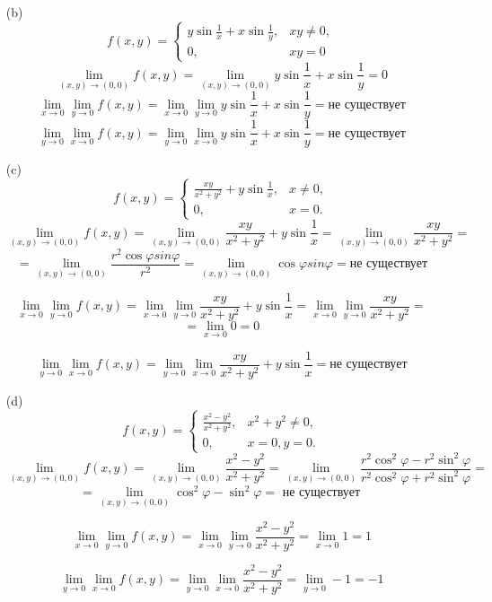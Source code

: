 \documentclass[a4paper]{article}
\begin{document}
\begin{enumerate}
\begin{enumerate}
        \item[(b)]$$ f(x, y) = \begin{cases} y \sin \frac{1}{x} + x \sin \frac{1}{y}, & xy \neq 0, \\ 0, & xy = 0 \end{cases} $$
        $$\lim_{(x, y) \to (0, 0)} f(x, y) = \lim_{(x, y) \to (0, 0)} y \sin \frac{1}{x} + x \sin \frac{1}{y} = 0$$
        $$\lim _{x \rightarrow 0} \lim _{y \rightarrow 0} f(x, y) = \lim _{x \rightarrow 0} \lim _{y \rightarrow 0} y \sin \frac{1}{x} + x \sin \frac{1}{y} = \text{не существует}$$
        $$\lim _{y \rightarrow 0} \lim _{x \rightarrow 0} f(x, y) = \lim _{y \rightarrow 0} \lim _{x \rightarrow 0} y \sin \frac{1}{x} + x \sin \frac{1}{y} = \text{не существует}$$
    
        \item[(c)]$$
        f(x, y) = \begin{cases}
        \frac{xy}{x^2 + y^2} + y \sin \frac{1}{x}, & x \neq 0, \\
        0, & x = 0.
        \end{cases}
        $$
        $$\lim_{(x, y) \to (0, 0)} f(x, y) = \lim_{(x, y) \to (0, 0)}\frac{xy}{x^2 + y^2} + y \sin \frac{1}{x} = \lim_{(x, y) \to (0, 0)}\frac{xy}{x^2 + y^2} =$$
        $$= \lim_{(x, y) \to (0, 0)}\frac{r^2\cos \varphi sin \varphi}{r^2} = \lim_{(x, y) \to (0, 0)}\cos \varphi sin \varphi = \text{не существует}$$
    
        $$\lim _{x \rightarrow 0} \lim _{y \rightarrow 0} f(x, y) = \lim _{x \rightarrow 0} \lim _{y \rightarrow 0} \frac{xy}{x^2 + y^2} + y \sin \frac{1}{x} = \lim _{x \rightarrow 0} \lim _{y \rightarrow 0} \frac{xy}{x^2 + y^2} = $$
        $$=\lim _{x \rightarrow 0} 0 = 0$$
        
        $$\lim _{y \rightarrow 0} \lim _{x \rightarrow 0} f(x, y) = \lim _{y \rightarrow 0} \lim _{x \rightarrow 0} \frac{xy}{x^2 + y^2} + y \sin \frac{1}{x} = \text{не существует}$$
    
        \item[(d)]
        $$
        f(x, y) = \begin{cases}
        \frac{x^2 - y^2}{x^2 + y^2}, & x^2 + y^2 \neq 0, \\
        0, & x = 0, y = 0.
        \end{cases}
        $$
        $$\lim_{(x, y) \to (0, 0)} f(x, y) = \lim_{(x, y) \to (0, 0)} \frac{x^2 - y^2}{x^2 + y^2} = \lim_{(x, y) \to (0, 0)} \frac{r^2\cos^2 \varphi - r^2\sin^2 \varphi}{r^2\cos^2 \varphi + r^2\sin^2 \varphi} = $$
        $$= \lim_{(x, y) \to (0, 0)} \cos^2 \varphi - \sin^2 \varphi = \text{ не существует }$$
        
        $$\lim _{x \rightarrow 0} \lim _{y \rightarrow 0} f(x, y) = \lim _{x \rightarrow 0} \lim _{y \rightarrow 0} \frac{x^2 - y^2}{x^2 + y^2} = \lim _{x \rightarrow 0} 1 = 1$$
        
        $$\lim _{y \rightarrow 0} \lim _{x \rightarrow 0} f(x, y) = \lim _{y \rightarrow 0} \lim _{x \rightarrow 0} \frac{x^2 - y^2}{x^2 + y^2} = \lim _{y \rightarrow 0} -1 = -1$$
    \end{enumerate}
\end{enumerate}
\end{document}

